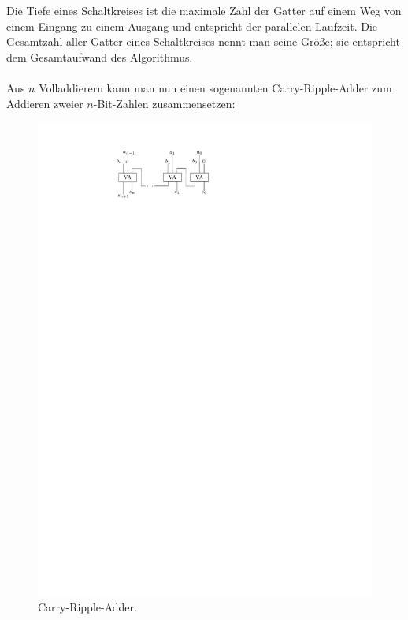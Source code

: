 \noindent Die Tiefe eines Schaltkreises ist die maximale Zahl der Gatter auf einem Weg von einem Eingang zu einem Ausgang und entspricht der 
parallelen Laufzeit.
Die Gesamtzahl aller Gatter eines Schaltkreises nennt man seine Größe; sie entspricht dem Gesamtaufwand des Algorithmus.
\\
\\Aus $n$ Volladdierern kann man nun einen sogenannten Carry-Ripple-Adder zum Addieren zweier $n$-Bit-Zahlen 
zusammensetzen: 
\begin{figure}[h]
\centering
\includegraphics[scale=1.2]{bilder/Carry-Ripple-Adder.pdf}
\caption{Carry-Ripple-Adder.}
\end{figure}

